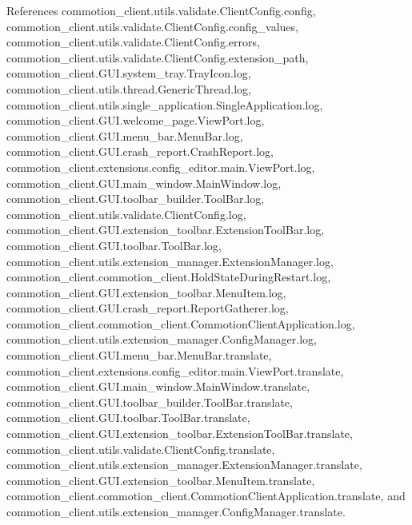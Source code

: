 References commotion\-\_\-client.\-utils.\-validate.\-Client\-Config.\-config, commotion\-\_\-client.\-utils.\-validate.\-Client\-Config.\-config\-\_\-values, commotion\-\_\-client.\-utils.\-validate.\-Client\-Config.\-errors, commotion\-\_\-client.\-utils.\-validate.\-Client\-Config.\-extension\-\_\-path, commotion\-\_\-client.\-G\-U\-I.\-system\-\_\-tray.\-Tray\-Icon.\-log, commotion\-\_\-client.\-utils.\-thread.\-Generic\-Thread.\-log, commotion\-\_\-client.\-utils.\-single\-\_\-application.\-Single\-Application.\-log, commotion\-\_\-client.\-G\-U\-I.\-welcome\-\_\-page.\-View\-Port.\-log, commotion\-\_\-client.\-G\-U\-I.\-menu\-\_\-bar.\-Menu\-Bar.\-log, commotion\-\_\-client.\-G\-U\-I.\-crash\-\_\-report.\-Crash\-Report.\-log, commotion\-\_\-client.\-extensions.\-config\-\_\-editor.\-main.\-View\-Port.\-log, commotion\-\_\-client.\-G\-U\-I.\-main\-\_\-window.\-Main\-Window.\-log, commotion\-\_\-client.\-G\-U\-I.\-toolbar\-\_\-builder.\-Tool\-Bar.\-log, commotion\-\_\-client.\-utils.\-validate.\-Client\-Config.\-log, commotion\-\_\-client.\-G\-U\-I.\-extension\-\_\-toolbar.\-Extension\-Tool\-Bar.\-log, commotion\-\_\-client.\-G\-U\-I.\-toolbar.\-Tool\-Bar.\-log, commotion\-\_\-client.\-utils.\-extension\-\_\-manager.\-Extension\-Manager.\-log, commotion\-\_\-client.\-commotion\-\_\-client.\-Hold\-State\-During\-Restart.\-log, commotion\-\_\-client.\-G\-U\-I.\-extension\-\_\-toolbar.\-Menu\-Item.\-log, commotion\-\_\-client.\-G\-U\-I.\-crash\-\_\-report.\-Report\-Gatherer.\-log, commotion\-\_\-client.\-commotion\-\_\-client.\-Commotion\-Client\-Application.\-log, commotion\-\_\-client.\-utils.\-extension\-\_\-manager.\-Config\-Manager.\-log, commotion\-\_\-client.\-G\-U\-I.\-menu\-\_\-bar.\-Menu\-Bar.\-translate, commotion\-\_\-client.\-extensions.\-config\-\_\-editor.\-main.\-View\-Port.\-translate, commotion\-\_\-client.\-G\-U\-I.\-main\-\_\-window.\-Main\-Window.\-translate, commotion\-\_\-client.\-G\-U\-I.\-toolbar\-\_\-builder.\-Tool\-Bar.\-translate, commotion\-\_\-client.\-G\-U\-I.\-toolbar.\-Tool\-Bar.\-translate, commotion\-\_\-client.\-G\-U\-I.\-extension\-\_\-toolbar.\-Extension\-Tool\-Bar.\-translate, commotion\-\_\-client.\-utils.\-validate.\-Client\-Config.\-translate, commotion\-\_\-client.\-utils.\-extension\-\_\-manager.\-Extension\-Manager.\-translate, commotion\-\_\-client.\-G\-U\-I.\-extension\-\_\-toolbar.\-Menu\-Item.\-translate, commotion\-\_\-client.\-commotion\-\_\-client.\-Commotion\-Client\-Application.\-translate, and commotion\-\_\-client.\-utils.\-extension\-\_\-manager.\-Config\-Manager.\-translate.


